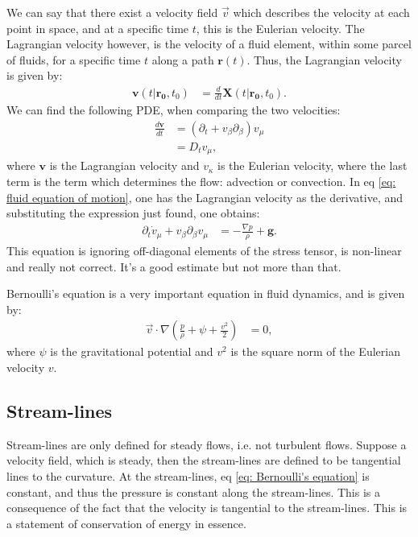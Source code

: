 \documentclass[a4paper]{article}
\begin{document}
We can say that there exist a velocity field $\vec{v}$ which describes the velocity at each point in space, and at a specific time $t$, this is the Eulerian velocity. 
The Lagrangian velocity however, is the velocity of a fluid element, within some parcel of fluids, for a specific time $t$ along a path $\mathbf{r}(t)$.
Thus, the Lagrangian velocity is given by:
\begin{align*}
    \mathbf{v}(t | \mathbf{r_0}, t_0) &=\frac{d}{dt}\mathbf{X}(t | \mathbf{r_0}, t_0).
\end{align*}We can find the following PDE, when comparing the two velocities:
\begin{align*}
    \frac{d\mathbf{v}}{dt} &= \left(\partial_t + v_\beta\partial_\beta\right)v_\mu\\
     &= D_tv_\mu,
\end{align*}where $\mathbf{v}$ is the Lagrangian velocity and $v_\kappa$ is the Eulerian velocity, where the last term is the term which determines the flow: advection or convection.
In eq \eqref{eq: fluid equation of motion}, one has the Lagrangian velocity as the derivative, and substituting the expression just found, one obtains:
\begin{align}
    \partial_t\dot{v}_\mu + v_\beta\partial_\beta v_\mu &= -\frac{\nabla p}{\rho} + \mathbf{g}.\label{eq: euler equation of fluids}
\end{align}This equation is ignoring off-diagonal elements of the stress tensor, is non-linear and really not correct. It's a good estimate but not more than that.

\vspace*{0.5cm}\noindent
Bernoulli's equation is a very important equation in fluid dynamics, and is given by:
\begin{align}
    \vec{v}\cdot\nabla\left(\frac{p}{\rho} + \psi + \frac{v^2}{2}\right) &= 0,\label{eq: Bernoulli's equation}
\end{align}where $\psi$ is the gravitational potential and $v^2$ is the square norm of the Eulerian velocity $v$.

\subsection{Stream-lines}
Stream-lines are only defined for steady flows, i.e. not turbulent flows. Suppose a velocity field, which is steady, then the stream-lines are defined to be tangential lines to the curvature.
At the stream-lines, eq \eqref{eq: Bernoulli's equation} is constant, and thus the pressure is constant along the stream-lines. This is a consequence of the fact that the velocity is tangential to the stream-lines.
This is a statement of conservation of energy in essence.
\end{document}
